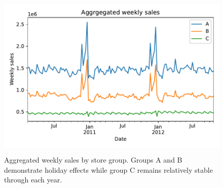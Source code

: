 \documentclass[english, 12pt, a4paper, sci, utf8, a-1b, online]{aaltothesis}
\begin{document}





\begin{figure}[htb]
	\centering
	\includegraphics[height=8cm]{../plots/dataset/dataset_plot_y.pdf}
	\caption{Aggregated weekly sales by store group. Groups A and B demonstrate holiday effects while group C remains relatively stable through each year.
	}
	\label{fig:data_y}
\end{figure}
\end{document}
